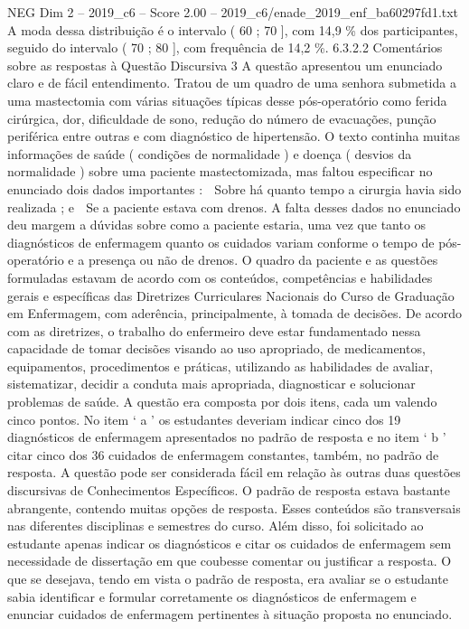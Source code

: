 \begin{textsample}{NEG Dim 2 – 2019\_c6 – Score 2.00 – 2019\_c6/enade\_2019\_enf\_ba60297fd1.txt}
A moda dessa distribuição é o intervalo ( 60 ; 70 ], com 14,9 \% dos participantes, seguido do intervalo ( 70 ; 80 ], com frequência de 14,2 \%. 6.3.2.2 Comentários sobre as respostas à Questão Discursiva 3 A questão apresentou um enunciado claro e de fácil entendimento.
Tratou de um quadro de uma senhora submetida a uma mastectomia com várias situações típicas desse pós-operatório como ferida cirúrgica, dor, dificuldade de sono, redução do número de evacuações, punção periférica entre outras e com diagnóstico de hipertensão.
O texto continha muitas informações de saúde ( condições de normalidade ) e doença ( desvios da normalidade ) sobre uma paciente mastectomizada, mas faltou especificar no enunciado dois dados importantes :  Sobre há quanto tempo a cirurgia havia sido realizada ; e  Se a paciente estava com drenos.
A falta desses dados no enunciado deu margem a dúvidas sobre como a paciente estaria, uma vez que tanto os diagnósticos de enfermagem quanto os cuidados variam conforme o tempo de pós-operatório e a presença ou não de drenos.
O quadro da paciente e as questões formuladas estavam de acordo com os conteúdos, competências e habilidades gerais e específicas das Diretrizes Curriculares Nacionais do Curso de Graduação em Enfermagem, com aderência, principalmente, à tomada de decisões.
De acordo com as diretrizes, o trabalho do enfermeiro deve estar fundamentado nessa capacidade de tomar decisões visando ao uso apropriado, de medicamentos, equipamentos, procedimentos e práticas, utilizando as habilidades de avaliar, sistematizar, decidir a conduta mais apropriada, diagnosticar e solucionar problemas de saúde.
A questão era composta por dois itens, cada um valendo cinco pontos.
No item ‘ a ’ os estudantes deveriam indicar cinco dos 19 diagnósticos de enfermagem apresentados no padrão de resposta e no item ‘ b ’ citar cinco dos 36 cuidados de enfermagem constantes, também, no padrão de resposta.
A questão pode ser considerada fácil em relação às outras duas questões discursivas de Conhecimentos Específicos.
O padrão de resposta estava bastante abrangente, contendo muitas opções de resposta.
Esses conteúdos são transversais nas diferentes disciplinas e semestres do curso.
Além disso, foi solicitado ao estudante apenas indicar os diagnósticos e citar os cuidados de enfermagem sem necessidade de dissertação em que coubesse comentar ou justificar a resposta.
O que se desejava, tendo em vista o padrão de resposta, era avaliar se o estudante sabia identificar e formular corretamente os diagnósticos de enfermagem e enunciar cuidados de enfermagem pertinentes à situação proposta no enunciado.

\end{textsample}
